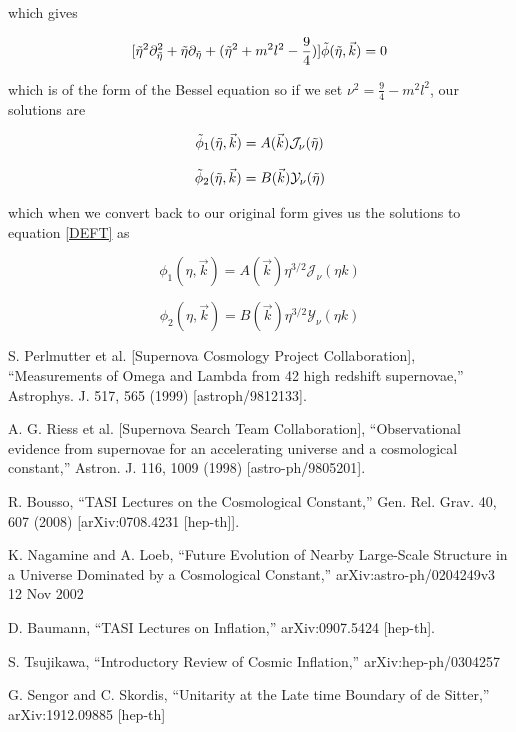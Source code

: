 \documentclass[a4paper,11pt]{article}
\numberwithin{equation}{section}
\numberwithin{figure}{section}
\begin{document}
\begin{large}
which gives

$$[{\Tilde{\eta}}^2\partial_{\Tilde{\eta}}^2+{\Tilde{\eta}}\partial_{\Tilde{\eta}}+(\Tilde{\eta}^2+m^2l^2-\frac{9}{4})]\Tilde{\phi}(\Tilde{\eta},\Vec{k})=0$$

which is of the form of the Bessel equation so if we set $\nu^2=\frac{9}{4}-m^2l^2$, our solutions are

$$\Tilde{\phi}_1(\Tilde{\eta},\Vec{k})=A(\Vec{k})\mathcal{J}_\nu (\Tilde{\eta})$$

$$\Tilde{\phi}_2(\Tilde{\eta},\Vec{k})=B(\Vec{k})\mathcal{Y}_\nu (\Tilde{\eta})$$

which when we convert back to our original form gives us the solutions to equation \eqref{DEFT} as

$$\phi_1(\eta,\Vec{k})=A(\Vec{k})\eta^{3/2}\mathcal{J}_\nu (\eta k)$$

$$\phi_2(\eta,\Vec{k})=B(\Vec{k})\eta^{3/2}\mathcal{Y}_\nu (\eta k)$$



\newpage

\begin{thebibliography}{}

    S. Perlmutter et al. [Supernova Cosmology Project Collaboration], “Measurements of Omega
    and Lambda from 42 high redshift supernovae,” Astrophys. J. 517, 565 (1999) [astroph/9812133].


    A. G. Riess et al. [Supernova Search Team Collaboration], “Observational evidence from supernovae for an accelerating universe and a cosmological constant,” Astron. J. 116, 1009 (1998)
    [astro-ph/9805201].

    R. Bousso, “TASI Lectures on the Cosmological Constant,” Gen. Rel. Grav. 40, 607 (2008)
    [arXiv:0708.4231 [hep-th]].

    
    K. Nagamine and A. Loeb, “Future Evolution of Nearby Large-Scale Structure in a Universe
    Dominated by a Cosmological Constant,” arXiv:astro-ph/0204249v3 12 Nov 2002
    
    D. Baumann, “TASI Lectures on Inflation,” arXiv:0907.5424 [hep-th].
    
    S. Tsujikawa, “Introductory Review of Cosmic Inflation,” arXiv:hep-ph/0304257
    
    G. Sengor and C. Skordis, “Unitarity at the Late time Boundary of de Sitter,” arXiv:1912.09885 [hep-th]
    

\end{thebibliography}
\end{large}
\end{document}
